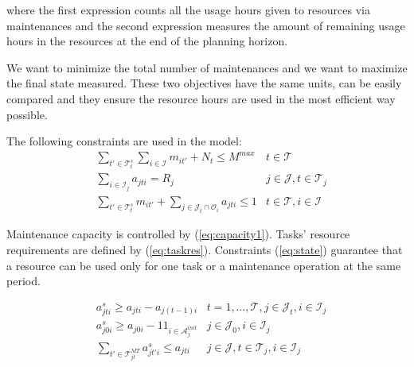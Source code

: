 \documentclass[a4paper,onecolumn,fleqn]{article}
\begin{document}
    where the first expression counts all the usage hours given to resources via maintenances and the second expression measures the amount of remaining usage hours in the resources at the end of the planning horizon.

    We want to minimize the total number of maintenances and we want to maximize the final state measured. These two objectives have the same units, can be easily compared and they ensure the resource hours are used in the most efficient way possible.

    The following constraints are used in the model:       
    \begin{align}
        & \sum_{t' \in \mathcal{T}^{s}_t} \sum_{i \in \mathcal{I}} m_{it'} + N_t \leq M^{max}
          & t \in \mathcal{T} \label{eq:capacity1}\\
        & \sum_{i \in \mathcal{I}_j} a_{jti} = R_j
                & j \in \mathcal{J}, t \in \mathcal{T}_j  \label{eq:taskres}\\
        & \sum_{t' \in \mathcal{T}^{s}_t} m_{it'} + \sum_{j \in \mathcal{J}_t \cap \mathcal{O}_i} a_{jti} \leq 1 
                & t \in \mathcal{T}, i \in \mathcal{I} \label{eq:state}
    \end{align}


    Maintenance capacity is controlled by (\ref{eq:capacity1}). Tasks' resource requirements are defined by (\ref{eq:taskres}). Constraints (\ref{eq:state}) guarantee that a resource can be used only for one task or a maintenance operation at the same period.  

    \begin{align}
        & a^s_{jti} \geq a_{jti} - a_{j(t-1)i}
                & t =1, ..., \mathcal{T}, j \in \mathcal{J}_t, i \in \mathcal{I}_j \label{eq:start1} \\
        & a^s_{j0i} \geq a_{j0i} - 1 \!1_{i \in \mathcal{A}^{init}_{j}}
                & j \in \mathcal{J}_0, i \in \mathcal{I}_j \label{eq:start2} \\        
        & \sum_{t' \in \mathcal{T}^{MT}_{jt}} a^s_{jt'i} \leq a_{jti} 
        & j \in \mathcal{J}, t \in \mathcal{T}_j, i \in \mathcal{I}_j \label{eq:start3}
    \end{align}
\end{document}
